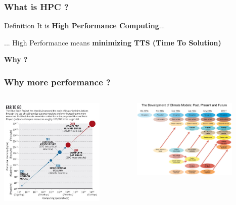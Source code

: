 \begin{frame}[containsverbatim]
\frametitle{What is HPC ?}

\begin{block}{Definition}
It is \textbf{High Performance Computing}...
\end{block}

\begin{block}{}
... High Performance means \textbf{minimizing TTS (Time To Solution)}
\end{block}

\begin{center}
\textbf{Why ?}
\end{center}
\end{frame}


\begin{frame}[containsverbatim]
\frametitle{Why more performance ?}
\begin{columns}[c]
	\begin{column}{5cm}
	\includegraphics[width=5cm]{DayGilles/images/far-to-go.jpg}
	\end{column} 
	\begin{column}{5cm}
	\includegraphics[width=5cm]{DayGilles/images/climatemodel.jpg}
	\end{column}
\end{columns} 

\end{frame}



